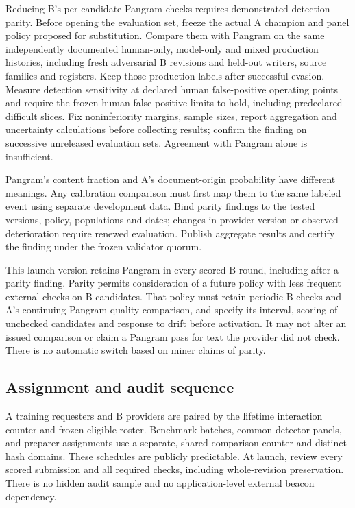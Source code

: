 Reducing B's per-candidate Pangram checks requires demonstrated
detection parity.
Before opening the evaluation set, freeze the actual A champion and
panel policy proposed for substitution. Compare them with Pangram on
the same independently documented human-only, model-only and mixed
production histories, including fresh adversarial B revisions and
held-out writers, source families and registers. Keep those production
labels after successful evasion. Measure detection sensitivity at
declared human false-positive operating points and require the frozen
human false-positive limits to hold, including predeclared difficult
slices. Fix noninferiority margins, sample sizes, report aggregation
and uncertainty calculations before collecting results; confirm the
finding on successive unreleased evaluation sets. Agreement with
Pangram alone is insufficient.

Pangram's content fraction and A's document-origin probability have
different meanings. Any calibration comparison must first map them to
the same labeled event using separate development data. Bind parity
findings to the tested versions, policy, populations and dates; changes
in provider version or observed deterioration require renewed evaluation.
Publish aggregate results and certify the finding under the frozen
validator quorum.

This launch version retains Pangram in every scored B round, including
after a parity finding. Parity permits consideration of a future policy
with less frequent external checks on B candidates. That policy must
retain periodic B checks and A's continuing Pangram quality comparison,
and specify its interval, scoring of unchecked
candidates and response to drift before activation. It may not alter an
issued comparison or claim a Pangram pass for text the provider did not
check. There is no automatic switch based on miner claims of parity.

\subsection{Assignment and audit sequence}\label{audit-sequence}

A training requesters and B providers are paired by the lifetime interaction counter
and frozen eligible roster. Benchmark batches, common detector panels,
and preparer assignments use a separate, shared comparison counter and
distinct hash domains. These schedules are publicly predictable. At
launch, review every scored submission and all required checks, including
whole-revision preservation. There is no hidden audit sample and no
application-level external beacon dependency.

